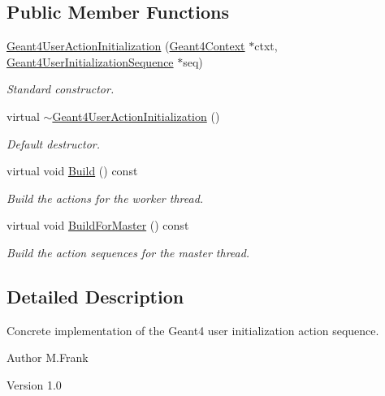 \subsection*{Public Member Functions}
\begin{DoxyCompactItemize}
\item 
\hyperlink{class_d_d4hep_1_1_simulation_1_1_geant4_user_action_initialization_ad5dad70e283015614959f397022c506a}{Geant4UserActionInitialization} (\hyperlink{class_d_d4hep_1_1_simulation_1_1_geant4_context}{Geant4Context} $\ast$ctxt, \hyperlink{class_d_d4hep_1_1_simulation_1_1_geant4_user_initialization_sequence}{Geant4UserInitializationSequence} $\ast$seq)
\begin{DoxyCompactList}\small\item\em Standard constructor. \item\end{DoxyCompactList}\item 
virtual \hyperlink{class_d_d4hep_1_1_simulation_1_1_geant4_user_action_initialization_a576b51911e71f7979dd327d8a76b1738}{$\sim$Geant4UserActionInitialization} ()
\begin{DoxyCompactList}\small\item\em Default destructor. \item\end{DoxyCompactList}\item 
virtual void \hyperlink{class_d_d4hep_1_1_simulation_1_1_geant4_user_action_initialization_ab3d53de87035e93453c2eebaea1ec2a0}{Build} () const 
\begin{DoxyCompactList}\small\item\em Build the actions for the worker thread. \item\end{DoxyCompactList}\item 
virtual void \hyperlink{class_d_d4hep_1_1_simulation_1_1_geant4_user_action_initialization_afebdf3b3108fb471defe56bd6d8faf03}{BuildForMaster} () const 
\begin{DoxyCompactList}\small\item\em Build the action sequences for the master thread. \item\end{DoxyCompactList}\end{DoxyCompactItemize}


\subsection{Detailed Description}
Concrete implementation of the Geant4 user initialization action sequence. \begin{DoxyAuthor}{Author}
M.Frank 
\end{DoxyAuthor}
\begin{DoxyVersion}{Version}
1.0 
\end{DoxyVersion}


